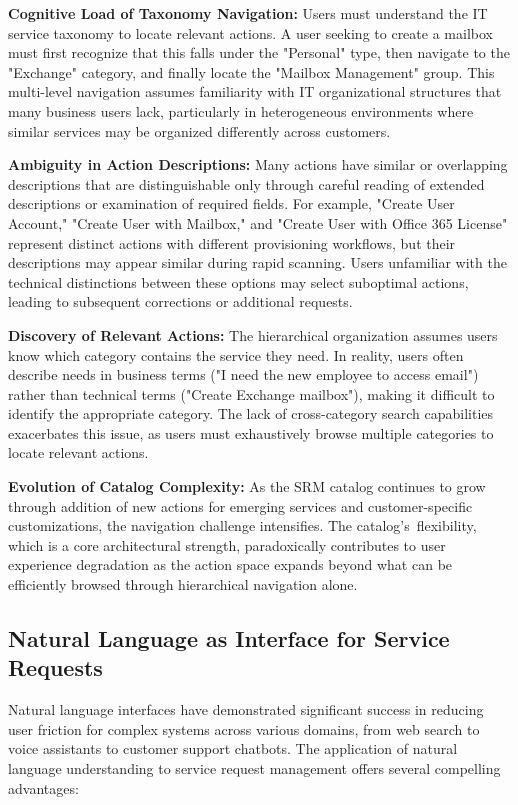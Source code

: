 \textbf{Cognitive Load of Taxonomy Navigation:} Users must understand the IT service taxonomy to locate relevant actions. A user seeking to create a mailbox must first recognize that this falls under the "Personal" type, then navigate to the "Exchange" category, and finally locate the "Mailbox Management" group. This multi-level navigation assumes familiarity with IT organizational structures that many business users lack, particularly in heterogeneous environments where similar services may be organized differently across customers.

\textbf{Ambiguity in Action Descriptions:} Many actions have similar or overlapping descriptions that are distinguishable only through careful reading of extended descriptions or examination of required fields. For example, "Create User Account," "Create User with Mailbox," and "Create User with Office 365 License" represent distinct actions with different provisioning workflows, but their descriptions may appear similar during rapid scanning. Users unfamiliar with the technical distinctions between these options may select suboptimal actions, leading to subsequent corrections or additional requests.

\textbf{Discovery of Relevant Actions:} The hierarchical organization assumes users know which category contains the service they need. In reality, users often describe needs in business terms ("I need the new employee to access email") rather than technical terms ("Create Exchange mailbox"), making it difficult to identify the appropriate category. The lack of cross-category search capabilities exacerbates this issue, as users must exhaustively browse multiple categories to locate relevant actions.

\textbf{Evolution of Catalog Complexity:} As the SRM catalog continues to grow through addition of new actions for emerging services and customer-specific customizations, the navigation challenge intensifies. The catalog's~flexibility, which is a core architectural strength, paradoxically contributes to user experience degradation as the action space expands beyond what can be efficiently browsed through hierarchical navigation alone.

\subsection{Natural Language as Interface for Service Requests}

Natural language interfaces have demonstrated significant success in reducing user friction for complex systems across various domains, from web search to voice assistants to customer support chatbots. The application of natural language understanding to service request management offers several compelling advantages:

